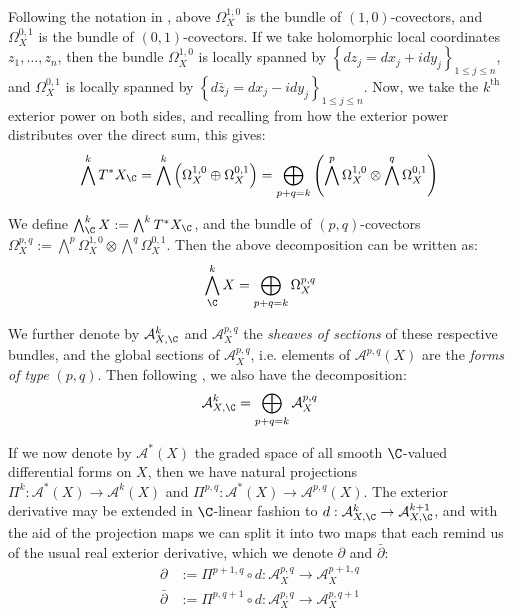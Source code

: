 \noindent Following the notation in \cite[Section 2.3]{VoisinI2002}, above $\Omega^{1,0}_X$ is the bundle of $(1,0)$-covectors, and $\Omega^{0,1}_X$ is the bundle of $(0,1)$-covectors. If we take holomorphic local coordinates $z_1, \ldots, z_n$, then the bundle $\Omega^{1,0}_X$ is locally spanned by $\left\{dz_j = dx_j + i dy_j\right\}_{1\leq j\leq n}$, and $\Omega^{0,1}_X$ is locally spanned by $\left\{d\bar{z}_j = dx_j - i dy_j\right\}_{1\leq j\leq n}$. Now, we take the $k^\text{th}$ exterior power on both sides, and recalling from \cite[Proposition XIX.1.4]{Lang2002} how the exterior power distributes over the direct sum, this gives:
$$
\bigwedge^kT^*X_\C = \bigwedge^k\left(\Omega^{1,0}_X \oplus \Omega^{0,1}_X\right) = \bigoplus_{p+q=k}\left( \bigwedge^p\Omega^{1,0}_X \otimes \bigwedge^q \Omega^{0,1}_X\right)
$$

\noindent We define $\bigwedge^k_\C X:=\bigwedge^k T^* X_\C$, and the bundle of $(p,q)$-covectors $\Omega^{p,q}_X:=\bigwedge^p \Omega^{1,0}_X \otimes \bigwedge^q \Omega^{0,1}_X$. Then the above decomposition can be written as:
$$
\bigwedge^k_\C X = \bigoplus_{p+q=k} \Omega_X^{p,q}
$$

\noindent We further denote by $\mathcal{A}^k_{X,\C}$ and $\mathcal{A}^{p,q}_X$ the \emph{sheaves of sections} of these respective bundles, and the global sections of $\mathcal{A}^{p,q}_X$, i.e. elements of $\mathcal{A}^{p,q}(X)$ are the \emph{forms of type} $(p,q)$. Then following \cite[Corollary 2.6.8]{Huybrechts2005}, we also have the decomposition:
$$
\mathcal{A}^k_{X,\C} = \bigoplus_{p+q=k} \mathcal{A}^{p,q}_X
$$

\noindent If we now denote by $\mathcal{A}^*(X)$ the graded space of all smooth $\C$-valued differential forms on $X$, then we have natural projections $\Pi^{k}:\mathcal{A}^*(X)\to \mathcal{A}^k(X)$ and $\Pi^{p,q}:\mathcal{A}^*(X)\to \mathcal{A}^{p,q}(X)$. The exterior derivative may be extended in $\C$-linear fashion to $d:\mathcal{A}^k_{X,\C}\to \mathcal{A}^{k+1}_{X,\C}$, and with the aid of the projection maps we can split it into two maps that each remind us of the usual real exterior derivative, which we denote $\partial$ and $\bar \partial$:
\begin{align*}
    \partial &:= \Pi^{p+1,q}\circ d:\mathcal{A}^{p,q}_X\to \mathcal{A}^{p+1,q}_X \\
    \bar \partial &:= \Pi^{p,q+1}\circ d:\mathcal{A}^{p,q}_X\to \mathcal{A}^{p,q+1}_X
\end{align*}

